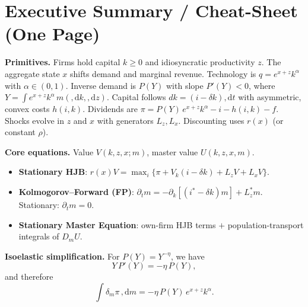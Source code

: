 ﻿\documentclass[11pt,letterpaper,oneside]{article}
\numberwithin{equation}{section}
\newcommand{\1}{\mathbf{1}}
\newcommand{\diff}{,\mathrm{d}}
\newcommand{\Lz}{L_z}
\newcommand{\Lx}{L_x}
\newcommand{\Lzadj}{L_z^{\!*}}
\newcommand{\dmU}{D_m U}
\begin{document}
\clearpage
\newpage
\section*{Executive Summary / Cheat-Sheet (One Page)}
\begin{tcolorbox}[didacticstyle]
\textbf{Primitives.} Firms hold capital $k\!\ge 0$ and idiosyncratic productivity $z$. The aggregate state $x$ shifts demand and marginal revenue. Technology is $q=e^{x+z}k^\alpha$ with $\alpha\in(0,1)$. Inverse demand is $P(Y)$ with slope $P'(Y)<0$, where $Y=\int e^{x+z}k^\alpha\,m(\diff k,\diff z)$. Capital follows $dk=(i-\delta k)\diff t$ with asymmetric, convex costs $h(i,k)$. Dividends are $\pi = P(Y)\,e^{x+z}k^\alpha - i - h(i,k) - f$. Shocks evolve in $z$ and $x$ with generators $\Lz,\Lx$. Discounting uses $r(x)$ (or constant $\rho$).
\medskip

\textbf{Core equations.} Value $V(k,z,x;m)$, master value $U(k,z,x,m)$.
\begin{itemize}[leftmargin=1.25em]
\item \textbf{Stationary HJB}: $r(x)V=\max_i\{\pi+V_k(i-\delta k)+\Lz V+\Lx V\}$.
\item \textbf{Kolmogorov--Forward (FP)}: $\partial_t m=-\partial_k[(i^*-\delta k)m]+\Lzadj m$. Stationary: $\partial_t m=0$.
\item \textbf{Stationary Master Equation}: own-firm HJB terms $+$ population-transport integrals of $\dmU$.

\end{itemize}


\textbf{Isoelastic simplification.} For $P(Y)=Y^{-\eta}$, we have
\[
Y\,P'(Y)=-\eta\,P(Y),
\]
and therefore
\[
\int \delta_m \pi\,\diff m = -\eta\,P(Y)\,e^{x+z}k^\alpha.
\]


\end{tcolorbox}
\end{document}
